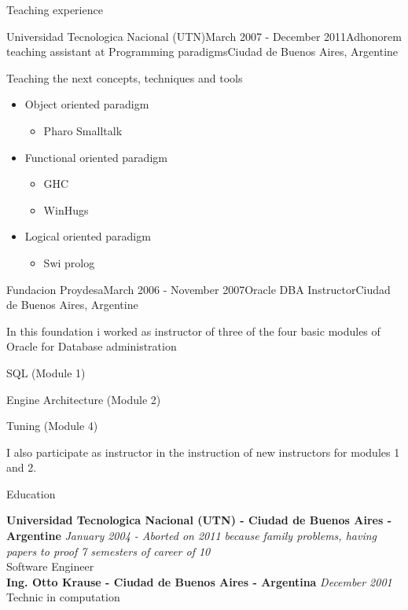 \documentclass{resume} %
\begin{document}
\begin{rSection}{Teaching experience}
\begin{rSubsection}{Universidad Tecnologica Nacional (UTN)}{March 2007 - December 2011}{Adhonorem teaching assistant at Programming paradigms}{Ciudad de Buenos Aires, Argentine}
\item Teaching the next concepts, techniques and tools
\begin{itemize}
	\item Object oriented paradigm
	\begin{itemize}
		\item Pharo Smalltalk
	\end{itemize}
	\item Functional oriented paradigm
	\begin{itemize}
		\item GHC
		\item WinHugs
	\end{itemize}
	\item Logical oriented paradigm 
	\begin{itemize}
		\item  Swi prolog
	\end{itemize}
\end{itemize}
\end{rSubsection}


\begin{rSubsection}{Fundacion Proydesa}{March 2006 - November 2007}{Oracle DBA Instructor}{Ciudad de Buenos Aires, Argentine}
\item In this foundation i worked as instructor of three of the four basic modules of Oracle for Database administration
\item SQL (Module 1)
\item Engine Architecture (Module 2)
\item Tuning (Module 4)
\item I also participate as instructor in the instruction of new instructors for modules 1 and 2.
\end{rSubsection}


\end{rSection}




\begin{rSection}{Education}


{\bf Universidad Tecnologica Nacional (UTN) - Ciudad de Buenos Aires - Argentine} \hfill {\em January 2004 - Aborted on 2011 because family problems, having papers to proof 7 semesters of career of 10 } \\ 
Software Engineer  \\

{\bf Ing. Otto Krause - Ciudad de Buenos Aires - Argentina} \hfill {\em December 2001} \\ 
Technic in computation \\
\end{rSection}
\end{document}

